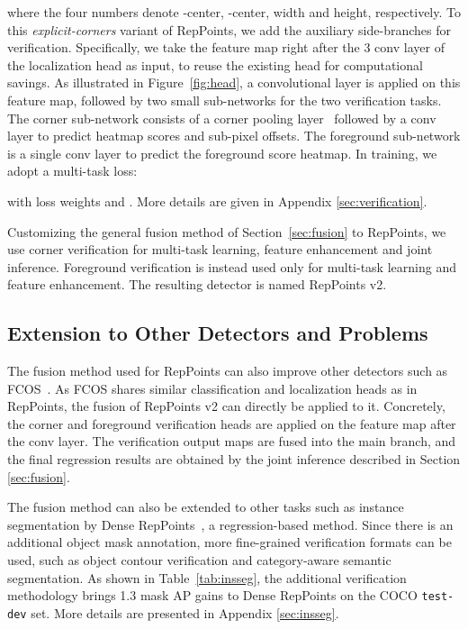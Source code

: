 \documentclass{article}
\begin{document}
where the four numbers denote -center, -center, width and height, respectively. To this {\em explicit-corners} variant of RepPoints, we add the auxiliary side-branches for verification. Specifically, we
take the feature map right after the 3 conv layer of the localization head as input, to reuse the existing head for computational savings. As illustrated in Figure~\ref{fig:head}, a  convolutional layer is applied on this feature map, followed by two small sub-networks for the two verification tasks. The corner sub-network consists of a corner pooling layer~\cite{CornerNet} followed by a  conv layer to predict heatmap scores and sub-pixel offsets. The foreground sub-network is a single  conv layer to predict the foreground score heatmap. In training, we adopt a multi-task loss:

with loss weights  and . More details are given in Appendix \ref{sec:verification}.

Customizing the general fusion method of Section~\ref{sec:fusion} to RepPoints, we use corner verification for multi-task learning, feature enhancement and joint inference. Foreground verification is instead used only for multi-task learning and feature enhancement. The resulting detector is named RepPoints v2.

\subsection{Extension to Other Detectors and Problems}

The fusion method used for RepPoints can also improve other detectors such as FCOS~\cite{tian2019fcos}. As FCOS shares similar classification and localization heads as in RepPoints, the fusion of RepPoints v2 can directly be applied to it. Concretely, the corner and foreground verification heads are applied on the feature map after the  conv layer. The verification output maps are fused into the main branch, and the final regression results are obtained by the joint inference described in Section \ref{sec:fusion}. 


The fusion method can also be extended to other tasks such as instance segmentation by Dense RepPoints~\cite{yang19densereppts}, a regression-based method. Since there is an additional object mask annotation, more fine-grained verification formats can be used, such as object contour verification and category-aware semantic segmentation. As shown in Table~\ref{tab:insseg}, the additional verification methodology brings 1.3 mask AP gains to Dense RepPoints on the COCO \texttt{test-dev} set. More details are presented in Appendix \ref{sec:insseg}.
\end{document}
